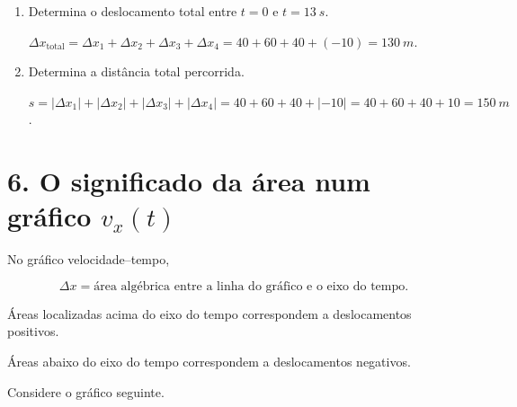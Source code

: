 \documentclass[11pt,a4paper]{article}
\begin{document}
\begin{enumerate}[label=\textbf{\arabic*.},resume]
		\item Determina o deslocamento total entre $t=0$ e $t=\SI{13}{s}$.
		
		\begin{solucao}
			$\Delta x_{\text{total}} = \Delta x_1 + \Delta x_2 + \Delta x_3 + \Delta x_4 = 40 + 60 + 40 + (-10) = \SI{130}{m}$.
		\end{solucao}
		
		\item Determina a distância total percorrida.
		
		\begin{solucao}
			$s = |\Delta x_1| + |\Delta x_2| + |\Delta x_3| + |\Delta x_4| = 40 + 60 + 40 + |-10| = 40 + 60 + 40 + 10 = \SI{150}{m}$.
		\end{solucao}
		
	\end{enumerate}
	
	\section*{6. O significado da área num gráfico $v_x(t)$}
	
	\begin{recorda}
		
		No gráfico velocidade--tempo,
		
		\[
		\Delta x=\text{área algébrica entre a linha do gráfico e o eixo do tempo}.
		\]
		
		Áreas localizadas acima do eixo do tempo correspondem a deslocamentos
		positivos.
		
		Áreas abaixo do eixo do tempo correspondem a deslocamentos negativos.
		
	\end{recorda}
	
	Considere o gráfico seguinte.
	
	\begin{center}
		
		
	\end{center}
	
\end{document}
